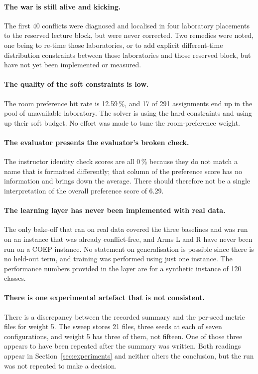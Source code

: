 \paragraph{The war is still alive and kicking.} The first 40 conflicts were diagnosed and
localised in four laboratory placements to the reserved lecture block, but were never corrected.
Two remedies were noted, one being to re-time those laboratories, or to add explicit different-time
distribution constraints between those laboratories and those reserved block, but have not yet been
implemented or measured.

\paragraph{The quality of the soft constraints is low.} The room preference hit rate is
12.59\,\%, and 17 of 291 assignments end up in the pool of unavailable laboratory. The solver is
using the hard constraints and using up their soft budget. No effort was made to tune the
room-preference weight.

\paragraph{The evaluator presents the evaluator's broken check.} The instructor identity check
scores are all 0\,\% because they do not match a name that is formatted differently; that column
of the preference score has no information and brings down the average. There should therefore not
be a single interpretation of the overall preference score of 6.29.

\paragraph{The learning layer has never been implemented with real data.} The only bake-off that
ran on real data covered the three baselines and was run on an instance that was already
conflict-free, and Arms L and R have never been run on a COEP instance. No statement on
generalisation is possible since there is no held-out term, and training was performed using just
one instance. The performance numbers provided in the layer are for a synthetic instance of 120
classes.

\paragraph{There is one experimental artefact that is not consistent.} There is a discrepancy
between the recorded summary and the per-seed metric files for weight 5. The sweep stores 21
files, three seeds at each of seven configurations, and weight 5 has three of them, not fifteen.
One of those three appears to have been repeated after the summary was written. Both
readings appear in Section~\ref{sec:experiments} and neither alters the conclusion, but the run
was not repeated to make a decision.

